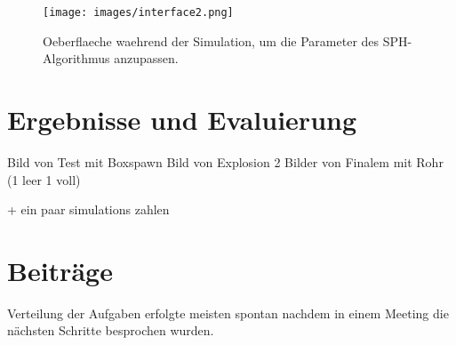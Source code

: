 \documentclass[a4paper]{paper}
\begin{document}
\begin{figure}[t]
    \centering
    \texttt{[image: images/interface2.png]}
    \caption{Oeberflaeche waehrend der Simulation, um die Parameter des SPH-Algorithmus anzupassen.}
    \label{fig:interface2}
\end{figure}

\section{Ergebnisse und Evaluierung}
Bild von Test mit Boxspawn
Bild von Explosion
2 Bilder von Finalem mit Rohr (1 leer 1 voll)

+ ein paar simulations zahlen

\section{Beiträge}
Verteilung der Aufgaben erfolgte meisten spontan nachdem in einem Meeting die nächsten Schritte besprochen wurden.
\end{document}
